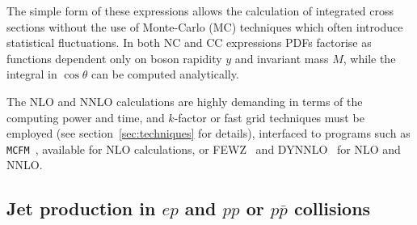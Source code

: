 The simple form of these expressions allows the calculation of integrated
cross sections without the use of Monte-Carlo (MC) techniques which often 
introduce statistical fluctuations.
In both NC and CC expressions PDFs
factorise as functions dependent only on boson rapidity \(y\) and
invariant mass \(M\), while
the integral in \(\cos\theta\) can be computed analytically.

The NLO and NNLO calculations are 
highly demanding
in terms of the computing power and time, and $k$-factor or fast grid techniques must be employed (see section~\ref{sec:techniques}
for details), interfaced to programs such as
\texttt{MCFM}~\cite{Campbell:1999ah,Campbell:2000je,Campbell:2010ff}, 
available for NLO calculations, or 
FEWZ~\cite{FEWZ} and DYNNLO~\cite{DYNNLO} for NLO and NNLO.
 






\subsection{Jet production in $ep$ and $pp$ or $p \bar p$ collisions}
\label{jetsection}

